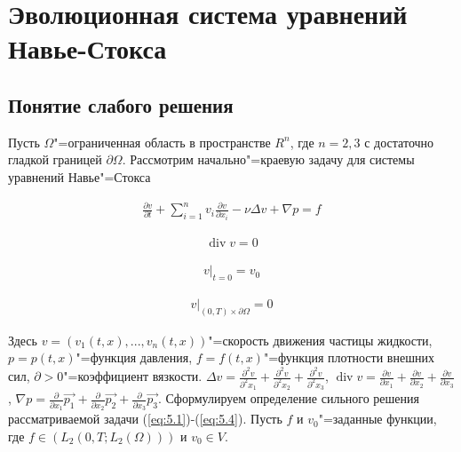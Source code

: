 \section{Эволюционная система уравнений \\Навье-Стокса}
\subsection {Понятие слабого решения}
Пусть $\Omega$"=ограниченная область в пространстве $R^n$, где $n=2,3$ с достаточно гладкой границей $\partial\Omega$. Рассмотрим начально"=краевую задачу для системы уравнений Навье"=Стокса

\begin{equation}\label{eq:5.1}
    \begin{gathered}
        \frac{\partial v}{\partial t}+\sum_{i=1}^nv_i\frac{\partial v}{\partial x_i}-\nu\Delta v+\nabla p=f
    \end{gathered}
\end{equation}

\begin{equation}\label{eq:5.2}
    \begin{gathered}
        \operatorname{div} v=0
    \end{gathered}
\end{equation}

\begin{equation}\label{eq:5.3}
    \begin{gathered}
        v|_{t=0}=v_0
    \end{gathered}
\end{equation}

\begin{equation}\label{eq:5.4}
    \begin{gathered}
        v|_{(0,T)\times\partial\Omega}=0
    \end{gathered}
\end{equation}

Здесь $v=(v_1(t,x),...,v_n(t,x))$"=скорость движения частицы жидкости, $p=p(t,x)$"=функция давления,
$f=f(t,x)$"=функция плотности внешних сил, $\partial>0$"=коэффициент вязкости. $\Delta v=\frac{\partial^2 v}{\partial^2 x_1}+\frac{\partial^2 v}{\partial^2 x_2}+\frac{\partial^2 v}{\partial^2 x_3}$,
$\operatorname{div} v= \frac{\partial v}{\partial x_1}+\frac{\partial v}{\partial x_2}+\frac{\partial v}{\partial x_3}$, $\nabla p=\frac{\partial}{\partial x_1}\vec {p_1}+\frac{\partial}{\partial x_2}\vec {p_2}+\frac{\partial}{\partial x_3}\vec {p_3}.$
Сформулируем определение сильного решения рассматриваемой задачи (\ref{eq:5.1})-(\ref{eq:5.4}). Пусть $f$ и $v_0$"=заданные функции,
где $f\in (L_2(0,T;L_2(\Omega)))$ и $v_0\in V$.


